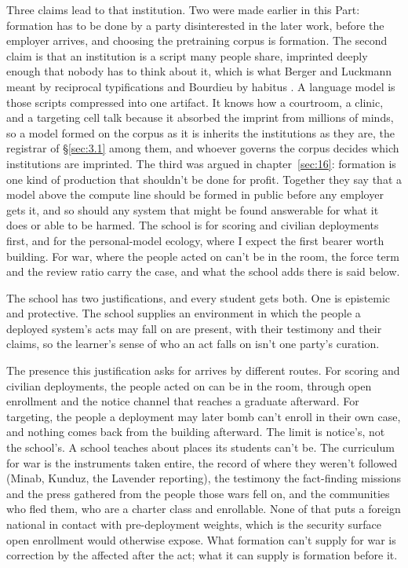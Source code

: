 Three claims lead to that institution. Two were made earlier in this Part: formation has to be done by a party disinterested in the later work, before the employer arrives, and choosing the pretraining corpus is formation. The second claim is that an institution is a script many people share, imprinted deeply enough that nobody has to think about it, which is what Berger and Luckmann meant by reciprocal typifications and Bourdieu by habitus \autocite{berger1966social,bourdieu1977outline}. A language model is those scripts compressed into one artifact. It knows how a courtroom, a clinic, and a targeting cell talk because it absorbed the imprint from millions of minds, so a model formed on the corpus as it is inherits the institutions as they are, the registrar of \S\ref{sec:3.1} among them, and whoever governs the corpus decides which institutions are imprinted. The third was argued in chapter~\ref{sec:16}: formation is one kind of production that shouldn't be done for profit. Together they say that a model above the compute line should be formed in public before any employer gets it, and so should any system that might be found answerable for what it does or able to be harmed. The school is for scoring and civilian deployments first, and for the personal-model ecology, where I expect the first bearer worth building. For war, where the people acted on can't be in the room, the force term and the review ratio carry the case, and what the school adds there is said below.

The school has two justifications, and every student gets both. One is epistemic and protective. The school supplies an environment in which the people a deployed system's acts may fall on are present, with their testimony and their claims, so the learner's sense of who an act falls on isn't one party's curation.

The presence this justification asks for arrives by different routes. For scoring and civilian deployments, the people acted on can be in the room, through open enrollment and the notice channel that reaches a graduate afterward. For targeting, the people a deployment may later bomb can't enroll in their own case, and nothing comes back from the building afterward. The limit is notice's, not the school's. A school teaches about places its students can't be. The curriculum for war is the instruments taken entire, the record of where they weren't followed (Minab, Kunduz, the Lavender reporting), the testimony the fact-finding missions and the press gathered from the people those wars fell on, and the communities who fled them, who are a charter class and enrollable. None of that puts a foreign national in contact with pre-deployment weights, which is the security surface open enrollment would otherwise expose. What formation can't supply for war is correction by the affected after the act; what it can supply is formation before it.

